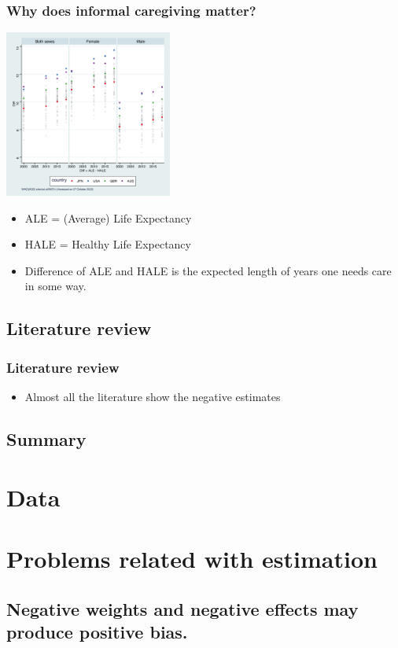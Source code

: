 \documentclass{beamer}
\begin{document}
        \begin{frame}\frametitle{Why does informal caregiving matter?}
            \begin{center}
            \includegraphics[width = 5.5cm]{WHO_diff_expectancy.png}
            \end{center}
            \begin{itemize}
                \item ALE = (Average) Life Expectancy
                \item HALE = Healthy Life Expectancy
                \item Difference of ALE and HALE is the expected length of years one needs care in some way.
            \end{itemize}
        \end{frame}
    \subsection{Literature review}
        \begin{frame}\frametitle{Literature review}
            \begin{itemize}
                \item Almost all the literature show the negative estimates
            \end{itemize}
        \end{frame}
    \subsection{Summary}

\section{Data}
\section{Problems related with estimation}
    \subsection{Negative weights and negative effects may produce positive bias.}
\end{document}
